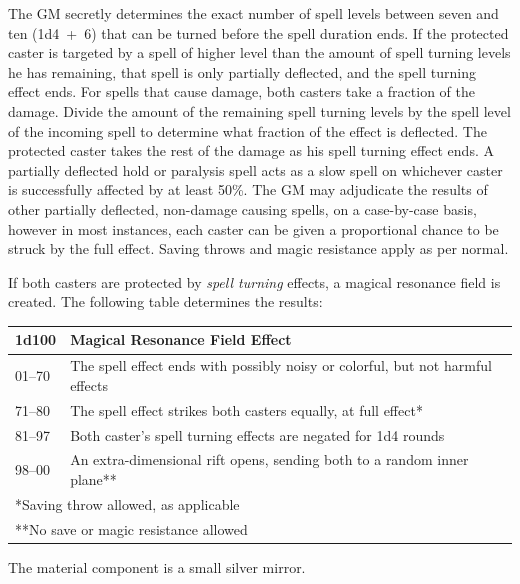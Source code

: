 \begin{multicols}{2}
The GM secretly determines the exact number of spell levels between seven and ten (1d4~+~6) that can be turned before the spell duration ends.  If the protected caster is targeted by a spell of higher level than the amount of spell turning levels he has remaining, that spell is only partially deflected, and the spell turning effect ends.  For spells that cause damage, both casters take a fraction of the damage.  Divide the amount of the remaining spell turning levels by the spell level of the incoming spell to determine what fraction of the effect is deflected.  The protected caster takes the rest of the damage as his spell turning effect ends.  A partially deflected hold or paralysis spell acts as a slow spell on whichever caster is successfully affected by at least 50\%.  The GM may adjudicate the results of other partially deflected, non-damage causing spells, on a case-by-case basis, however in most instances, each caster can be given a proportional chance to be struck by the full effect.  Saving throws and magic resistance apply as per normal.

If both casters are protected by \textit{spell turning} effects, a magical resonance field is created.  The following table determines the results:

\noindent
\begin{tabular}{|p{}|p{}|}
\hline
1d100	& Magical Resonance Field Effect \\
\hline\hline
\rowcolor[gray]{.9}01--70	& The spell effect ends with possibly noisy or colorful, but not harmful effects \\
71--80	& The spell effect strikes both casters equally, at full effect* \\
\rowcolor[gray]{.9}81--97	& Both caster's spell turning effects are negated for 1d4 rounds \\
98--00	& An extra-dimensional rift opens, sending both to a random inner plane** \\
\hline
\multicolumn{2}{l}{*Saving throw allowed, as applicable} \\
\multicolumn{2}{l}{**No save or magic resistance allowed} \\
\end{tabular}\vspace{.5em}

The material component is a small silver mirror.

\vspace{1em}

\noindent
\begin{minipage}{\columnwidth}


\end{minipage}
\end{multicols}

